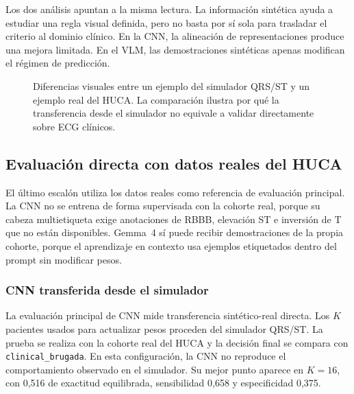 Los dos análisis apuntan a la misma lectura. La información sintética ayuda a estudiar una regla visual definida, pero no basta por sí sola para trasladar el criterio al dominio clínico. En la CNN, la alineación de representaciones produce una mejora limitada. En el VLM, las demostraciones sintéticas apenas modifican el régimen de predicción.

\begin{figure}[H]
  \centering
  \caption{Diferencias visuales entre un ejemplo del simulador QRS/ST y un ejemplo real del HUCA. La comparación ilustra por qué la transferencia desde el simulador no equivale a validar directamente sobre ECG clínicos.}
  \label{fig:synthetic_real_comparison}
\end{figure}

\subsection{Evaluación directa con datos reales del HUCA}

El último escalón utiliza los datos reales como referencia de evaluación principal. La CNN no se entrena de forma supervisada con la cohorte real, porque su cabeza multietiqueta exige anotaciones de RBBB, elevación ST e inversión de T que no están disponibles. Gemma~4 sí puede recibir demostraciones de la propia cohorte, porque el aprendizaje en contexto usa ejemplos etiquetados dentro del prompt sin modificar pesos.

\subsubsection{CNN transferida desde el simulador}

La evaluación principal de CNN mide transferencia sintético-real directa. Los \(K\) pacientes usados para actualizar pesos proceden del simulador QRS/ST. La prueba se realiza con la cohorte real del HUCA y la decisión final se compara con \texttt{clinical\_brugada}. En esta configuración, la CNN no reproduce el comportamiento observado en el simulador. Su mejor punto aparece en \(K=16\), con 0,516 de exactitud equilibrada, sensibilidad 0,658 y especificidad 0,375.

